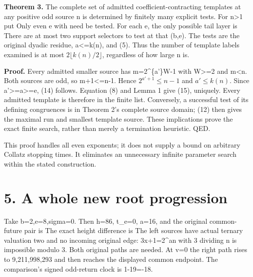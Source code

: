 \textbf{Theorem 3.} The complete set of admitted coefficient-contracting
templates at any positive odd source n is determined by finitely many
explicit tests. For n\textgreater1 put
 Only even e with
 need be tested. For each e, the
only possible tail layer is 
There are at most two support selectors to test at that (b,e). The tests
are the original dyadic residue, a\textless=k(n), and (5). Thus the
number of template labels examined is at most
\(2\lfloor k(n)/2\rfloor\), regardless of how large n is.

\textbf{Proof.} Every admitted smaller source has m=2\^{}\{a'\}W-1 with
W\textgreater=2 and m\textless n. Both sources are odd, so
m+1\textless=n-1. Hence \(2^{a'+1}\le n-1\) and \(a'\le k(n)\). Since
a'\textgreater=a\textgreater=e, (14) follows. Equation (8) and Lemma 1
give (15), uniquely. Every admitted template is therefore in the finite
list. Conversely, a successful test of its defining congruences is in
Theorem 2's complete source domain; (12) then gives the maximal run and
smallest template source. These implications prove the exact finite
search, rather than merely a termination heuristic. QED.

This proof handles all even exponents; it does not supply a bound on
arbitrary Collatz stopping times. It eliminates an unnecessary infinite
parameter search within the stated construction.

\section{5. A whole new root progression}

Take b=2,e=8,sigma=0. Then h=86, t\_e=0, a=16, and the original
common-future pair is  The exact height difference is
 The left sources have
actual ternary valuation two and no incoming original edge: 3x+1=2\^{}an
with 3 dividing n is impossible modulo 3. Both original paths are
needed. At v=0 the right path rises to 9,211,998,293 and then reaches
the displayed common endpoint. The comparison's signed odd-return clock
is 1-19=-18.

